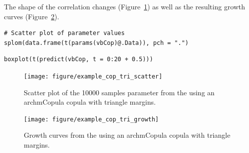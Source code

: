 \documentclass[a4paper,english,10pt]{article}\usepackage[]{graphicx}\usepackage[]{color}
\makeatletter
\newenvironment{kframe}{%
 \def\at@end@of@kframe{}%
 \ifinner\ifhmode%
  \def\at@end@of@kframe{\end{minipage}}%
  \begin{minipage}{\columnwidth}%
 \fi\fi%
 \def\FrameCommand##1{\hskip\@totalleftmargin \hskip-\fboxsep
 \colorbox{shadecolor}{##1}\hskip-\fboxsep
     \hskip-\linewidth \hskip-\@totalleftmargin \hskip\columnwidth}%
 \MakeFramed {\advance\hsize-\width
   \@totalleftmargin\z@ \linewidth\hsize
   \@setminipage}}%
 {\par\unskip\endMakeFramed%
 \at@end@of@kframe}
\newenvironment{knitrout}{}{} %
\makeatother
\begin{document}
The shape of the correlation changes (Figure~\ref{fig:plot_cop_tri_scatter}) as well as the resulting growth curves (Figure~\ref{fig:plot_cop_tri_growth}). 

\begin{knitrout}
\color{fgcolor}\begin{kframe}
\begin{verbatim}
# Scatter plot of parameter values
splom(data.frame(t(params(vbCop)@.Data)), pch = ".")
\end{verbatim}
\end{kframe}
\end{knitrout}


\begin{knitrout}
\color{fgcolor}\begin{kframe}
\begin{verbatim}
boxplot(t(predict(vbCop, t = 0:20 + 0.5)))
\end{verbatim}
\end{kframe}
\end{knitrout}


\begin{figure}[h]
\begin{knitrout}
\color{fgcolor}

{\centering \texttt{[image: figure/example\_cop\_tri\_scatter]} 

}



\end{knitrout}

\caption{Scatter plot of the 10000 samples parameter from the using an archmCopula copula with triangle margins.}
\label{fig:plot_cop_tri_scatter}
\end{figure}

\begin{figure}[h]
\begin{knitrout}
\color{fgcolor}

{\centering \texttt{[image: figure/example\_cop\_tri\_growth]} 

}



\end{knitrout}

\caption{Growth curves from the using an archmCopula copula with triangle margins.}
\label{fig:plot_cop_tri_growth}
\end{figure}
\end{document}
